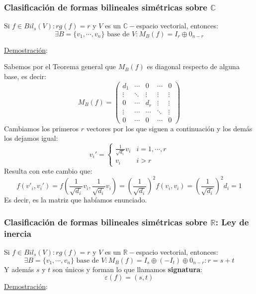 \documentclass[10pt,a4paper,openright]{book}
\begin{document}
\subsubsection*{Clasificación de formas bilineales simétricas sobre $\mathbb C$}
Si $f\in Bil_s(V): rg(f)= r$ y $V$ es un $\mathbb C -$espacio vectorial, entonces:
$$\exists B =\{v_1, \cdots , v_n\}\mbox{ base de }V: M_B(f) = I_r\oplus 0_{n-r}$$

\underline{Demostración}:

Sabemos por el Teorema general que $M_B(f)$ es diagonal respecto de alguna base, es decir:
$$M_B(f)=\begin{pmatrix} d_1 & \cdots & 0 & \cdots & 0 \\ \vdots & \ddots & \vdots & \vdots & \vdots \\ 0 & \cdots & d_r  & \vdots & \vdots \\ \vdots & \cdots & \cdots & \ddots & \vdots \\ 0 & \cdots & 0 & \cdots & 0\end{pmatrix}  $$
Cambiamos los primeros $r$ vectores por los que siguen a continuación y los demás los dejamos igual:
$$v_i' = \begin{cases} \frac{1}{\sqrt{d_i}}v_i & i = 1, \cdots , r \\ v_i& i > r\end{cases}$$
Resulta con este cambio que:
$$f(v'_i,v_i')=f\left(\frac{1}{\sqrt{d_i}}v_i, \frac{1}{\sqrt{d_i}}v_i\right) = \left(\frac{1}{\sqrt{d_i}}\right)^2f(v_i,v_i) = \left(\frac{1}{\sqrt{d_i}}\right)^2 d_i = 1 $$
Es decir, es la matriz que habíamos enunciado.

\subsubsection*{Clasificación de formas bilineales simétricas sobre $\mathbb R$: Ley de inercia}
Si $f\in Bil_s(V): rg(f)= r$ y $V$ es un $\mathbb R -$espacio vectorial, entonces:
$$\exists B =\{v_1, \cdots , v_n\}\mbox{ base de }V: M_B(f) = I_s\oplus (-I_t)\oplus 0_{n-r}: r = s+t$$
Y además $s$ y $t$ son únicos y forman lo que llamamos \textbf{signatura}:
$$\varepsilon(f) = (s,t)$$
\underline{Demostración}:
\end{document}
